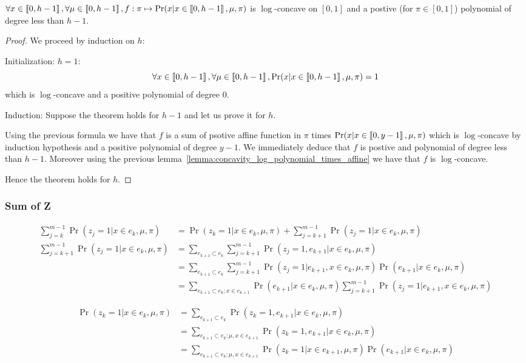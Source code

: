 \begin{thm}
    $\forall x \in \left\llbracket0, h - 1\right\rrbracket, \forall \mu \in \left\llbracket0, h - 1\right\rrbracket, f: \pi \mapsto \Pr(x | x \in \left\llbracket0, h - 1\right\rrbracket, \mu, \pi)$ is $\log$-concave on $[0, 1]$ and a postive (for $\pi \in [0, 1]$) polynomial of degree less than $h - 1$.
\end{thm}
\begin{proof}
    We proceed by induction on $h$:

    Initialization: $h = 1$: 
    \[ \forall x \in \left\llbracket0, h - 1\right\rrbracket, \forall \mu \in \left\llbracket0, h - 1\right\rrbracket, \Pr(x | x \in \left\llbracket0, h - 1\right\rrbracket, \mu, \pi) = 1\] which is $\log$-concave and a positive polynomial of degree $0$.

    Induction: Suppose the theorem holds for $h - 1$ and let us prove it for $h$.

    Using the previous formula we have that $f$ is a sum of psotive affine function in $\pi$ times $\Pr(x | x \in \left\llbracket0, y - 1\right\rrbracket, \mu, \pi)$ which is $\log$-concave by induction hypothesis and a positive polynomial of degree $y - 1$. We immediately deduce that $f$ is postive and polynomial of degree less than $h - 1$. Moreover using the previous lemma~\ref{lemma:concavity_log_polynomial_times_affine} we have that $f$ is $\log$-concave.

    Hence the theorem holds for $h$.
\end{proof}



\subsubsection{Sum of Z}

\begin{align}
    \sum_{j=k}^{m - 1} \Pr(z_j = 1 | x \in e_k, \mu, \pi) 
    &= \Pr(z_k = 1 | x \in e_k, \mu, \pi) + \sum_{j=k+1}^{m - 1} \Pr(z_j = 1 | x \in e_k, \mu, \pi) \\
    \sum_{j=k+1}^{m - 1} \Pr(z_j = 1 | x \in e_k, \mu, \pi) 
    &= \sum_{e_{k+1} \subset e_k} \sum_{j=k+1}^{m - 1} \Pr(z_j = 1, e_{k+1} | x \in e_k, \mu, \pi)  \\
    &= \sum_{e_{k+1} \subset e_k} \sum_{j=k+1}^{m - 1} \Pr(z_j = 1 | e_{k+1}, x \in e_k, \mu, \pi) \Pr(e_{k+1} | x \in e_k, \mu, \pi) \\
    &= \sum_{e_{k+1} \subset e_k ; x\in e_{k+1}} \Pr(e_{k+1} | x \in e_k, \mu, \pi) \sum_{j=k+1}^{m - 1} \Pr(z_j = 1 | e_{k+1}, x \in e_k, \mu, \pi) 
\end{align}


\begin{align}
    \Pr(z_k = 1 | x \in e_k, \mu, \pi) 
    &= \sum_{e_{k+1} \subset e_k} \Pr(z_k = 1, e_{k+1} | x \in e_k, \mu, \pi) \\
    &= \sum_{e_{k+1} \subset e_k; \mu, x \in e_{k+1}}  \Pr(z_k = 1, e_{k+1} | x \in e_k, \mu, \pi) \\
    &= \sum_{e_{k+1} \subset e_k; \mu, x \in e_{k+1}}  \Pr(z_k = 1 | x \in e_{k+1}, \mu, \pi) \Pr(e_{k+1} | x \in e_k, \mu, \pi)
\end{align}

